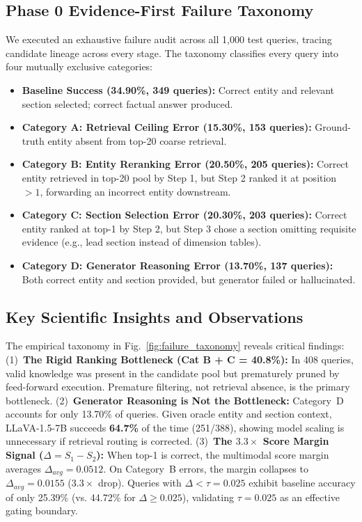 \documentclass[conference]{IEEEtran}
\begin{document}
\subsection{Phase 0 Evidence-First Failure Taxonomy}
We executed an exhaustive failure audit across all 1,000 test queries, tracing candidate lineage across every stage. The taxonomy classifies every query into four mutually exclusive categories:
\begin{itemize}
    \item \textbf{Baseline Success (34.90\%, 349 queries):} Correct entity and relevant section selected; correct factual answer produced.
    \item \textbf{Category A: Retrieval Ceiling Error (15.30\%, 153 queries):} Ground-truth entity absent from top-20 coarse retrieval.
    \item \textbf{Category B: Entity Reranking Error (20.50\%, 205 queries):} Correct entity retrieved in top-20 pool by Step 1, but Step 2 ranked it at position $>1$, forwarding an incorrect entity downstream.
    \item \textbf{Category C: Section Selection Error (20.30\%, 203 queries):} Correct entity ranked at top-1 by Step 2, but Step 3 chose a section omitting requisite evidence (e.g., lead section instead of dimension tables).
    \item \textbf{Category D: Generator Reasoning Error (13.70\%, 137 queries):} Both correct entity and section provided, but generator failed or hallucinated.
\end{itemize}

\subsection{Key Scientific Insights and Observations}
The empirical taxonomy in Fig.~\ref{fig:failure_taxonomy} reveals critical findings:
(1)~\textbf{The Rigid Ranking Bottleneck (Cat B + C = 40.8\%):} In 408 queries, valid knowledge was present in the candidate pool but prematurely pruned by feed-forward execution. Premature filtering, not retrieval absence, is the primary bottleneck.
(2)~\textbf{Generator Reasoning is Not the Bottleneck:} Category~D accounts for only 13.70\% of queries. Given oracle entity and section context, LLaVA-1.5-7B succeeds \textbf{64.7\%} of the time (251/388), showing model scaling is unnecessary if retrieval routing is corrected.
(3)~\textbf{The $3.3\times$ Score Margin Signal ($\Delta = S_1 - S_2$):} When top-1 is correct, the multimodal score margin averages $\Delta_{avg} = 0.0512$. On Category~B errors, the margin collapses to $\Delta_{avg} = 0.0155$ ($3.3\times$ drop). Queries with $\Delta < \tau = 0.025$ exhibit baseline accuracy of only 25.39\% (vs. 44.72\% for $\Delta \ge 0.025$), validating $\tau = 0.025$ as an effective gating boundary.
\end{document}
